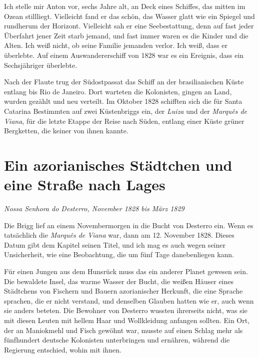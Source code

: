 \documentclass[
  ngerman,
  11pt,
  openany]{book}
\begin{document}
Ich stelle mir Anton vor, sechs Jahre alt, an Deck eines Schiffes, das
mitten im Ozean stillliegt. Vielleicht fand er das schön, das Wasser
glatt wie ein Spiegel und rundherum der Horizont. Vielleicht sah er eine
Seebestattung, denn auf fast jeder Überfahrt jener Zeit starb jemand,
und fast immer waren es die Kinder und die Alten. Ich weiß nicht, ob
seine Familie jemanden verlor. Ich weiß, dass er überlebte. Auf einem
Auswandererschiff von 1828 war es ein Ereignis, dass ein Sechsjähriger
überlebte.

Nach der Flaute trug der Südostpassat das Schiff an der brasilianischen
Küste entlang bis Rio de Janeiro. Dort warteten die Kolonisten, gingen
an Land, wurden gezählt und neu verteilt. Im Oktober 1828 schifften sich
die für Santa Catarina Bestimmten auf zwei Küstenbriggs ein, der
\emph{Luiza} und der \emph{Marquês de Viana}, für die letzte Etappe der
Reise nach Süden, entlang einer Küste grüner Bergketten, die keiner von
ihnen kannte.

\section{Ein azorianisches Städtchen und eine Straße nach
Lages}\label{ein-azorianisches-stuxe4dtchen-und-eine-strauxdfe-nach-lages}

\emph{Nossa Senhora do Desterro, November 1828 bis März 1829}

Die Brigg lief an einem Novembermorgen in die Bucht von Desterro ein.
Wenn es tatsächlich die \emph{Marquês de Viana} war, dann am 12.
November 1828. Dieses Datum gibt dem Kapitel seinen Titel, und ich mag
es auch wegen seiner Unsicherheit, wie eine Beobachtung, die um fünf
Tage danebenliegen kann.

Für einen Jungen aus dem Hunsrück muss das ein anderer Planet gewesen
sein. Die bewaldete Insel, das warme Wasser der Bucht, die weißen Häuser
eines Städtchens von Fischern und Bauern azorianischer Herkunft, die
eine Sprache sprachen, die er nicht verstand, und denselben Glauben
hatten wie er, auch wenn sie anders beteten. Die Bewohner von Desterro
wussten ihrerseits nicht, was sie mit diesen Leuten mit hellem Haar und
Wollkleidung anfangen sollten. Ein Ort, der an Maniokmehl und Fisch
gewöhnt war, musste auf einen Schlag mehr als fünfhundert deutsche
Kolonisten unterbringen und ernähren, während die Regierung entschied,
wohin mit ihnen.
\end{document}
